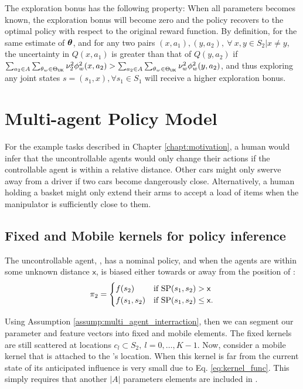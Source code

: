     \par
    The exploration bonus has the following property: When all parameters becomes known, the exploration bonus will
    become zero and the policy recovers to the optimal policy with respect to the original reward function. By
    definition, for the same estimate of  $\boldsymbol{\mathbb{\theta}}$, and for any two pairs $(x,a_1), (y,a_2),\ \forall\ x,y\in S_2 | x
    \neq y$, the uncertainty in $Q(x,a_1)$ is greater than that of $Q(y,a_2)$ if $\sum_{a_2\in A}\sum_{\theta_w\in
    \Theta_{\mathsf{UK}}} \nu_2^2 \phi^2_w(x,a_2) > \sum_{a_2\in A}\sum_{\theta_w\in \Theta_{\mathsf{UK}}}  \nu_w^2
    \phi^2_w(y,a_2)  $, and thus exploring any joint states $s=(s_1,x), \forall s_1 \in S_1$ will receive a higher
    exploration bonus.


\section{Multi-agent Policy Model}

    For the example tasks described in Chapter \ref{chapt:motivation}, a human would infer that the uncontrollable
    agents would only change their actions if the controllable agent is within a relative distance. Other cars might
    only swerve away from a driver if two cars become dangerously close. Alternatively, a human holding a basket might
    only extend their arms to accept a load of items when the manipulator is sufficiently close to them.

\subsection{Fixed and Mobile kernels for policy inference}\label{sec:fixed_and_mobile_kernels}

    \begin{assumption}\label{assump:multi_agent_interraction}
        The uncontrollable agent, , has a nominal policy, and when the agents are within some unknown distance
        $\mathsf{x}$,  is biased either towards or away from the position of :
        \begin{align*}
            \policy{2} & = \begin{cases}
                               f(s_2) & \text{if}\ \textnormal{SP}(s_1,s_2) > \mathsf{x} \\
                               f(s_1,s_2) & \text{if}\ \textnormal{SP}(s_1,s_2) \leq \mathsf{x}.
                           \end{cases} \\
        \end{align*}
    \end{assumption}

    Using Assumption \ref{assump:multi_agent_interraction}, then we can segment our parameter and feature vectors into
    fixed and mobile elements. The fixed kernels are still scattered at locations $c_l \subset S_2,\ l=0,\ldots,K-1$.
    Now, consider a mobile kernel that is attached to the \!'s location. When this kernel is far from the
    current state of  its anticipated influence is very small due to Eq. \ref{eq:kernel_func}. This simply
    requires that another $|A|$ parameters elements are included in \paramVec.

